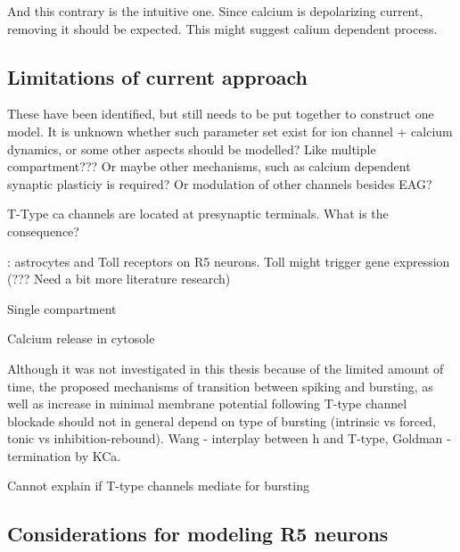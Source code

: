 \documentclass[../main.tex]{subfiles}
\begin{document}
And this contrary is the intuitive one. Since calcium is depolarizing current, removing it should be expected. This might suggest calium dependent process.

\color{black}



\subsection{Limitations of current approach}

These have been identified, but still needs to be put together to construct one model. It is unknown whether such parameter set exist for ion channel + calcium dynamics, or some other aspects should be modelled? Like multiple compartment??? Or maybe other mechanisms, such as calcium dependent synaptic plasticiy is required? Or modulation of other channels besides EAG?

T-Type ca channels are located at presynaptic terminals. What is the consequence?

\parencite{blumAstroglialCalciumSignaling2021}: astrocytes and Toll receptors on R5 neurons.
    Toll might trigger gene expression (??? Need a bit more literature research)

Single compartment

Calcium release in cytosole

Although it was not investigated in this thesis because of the limited amount of time, the proposed mechanisms of transition between spiking and bursting, as well as increase in minimal membrane potential following T-type channel blockade should not in general depend on type of bursting (intrinsic vs forced, tonic vs inhibition-rebound).
Wang - interplay between h and T-type, Goldman - termination by KCa.

Cannot explain if T-type channels mediate for bursting



\subsection{Considerations for modeling R5 neurons}
\end{document}
